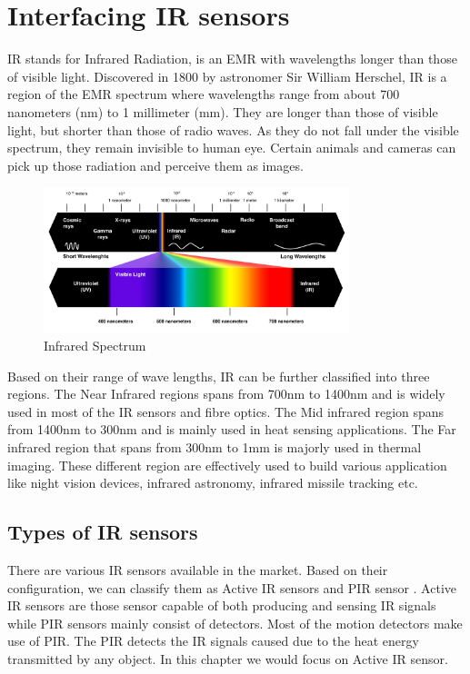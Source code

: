 \chapter{Interfacing IR sensors}
\label{ch:ir-sensors}

\ac{IR} stands for Infrared Radiation, is an \ac{EMR} with wavelengths longer than those of visible light. Discovered in 1800 by astronomer Sir William Herschel, \ac{IR} is a region of the \ac{EMR} spectrum where wavelengths range from about 700 nanometers (nm) to 1 millimeter (mm). They are longer than those of visible light, but shorter than those of radio waves. As they do not fall under the visible spectrum, they remain invisible to human eye. Certain animals and cameras can pick up those radiation and perceive them as images.

\begin{figure}
    \centering
	\includegraphics[width=3.5in]{Images/IR Sensor/IR_spectrum.jpg}
	\caption{Infrared Spectrum}
\end{figure}

Based on their range of wave lengths, \ac{IR} can be further classified into three regions. The Near Infrared regions spans from 700nm to 1400nm and is widely used in most of the \ac{IR} sensors and fibre optics. The Mid infrared region spans from 1400nm to 300nm and is mainly used in heat sensing applications. The Far infrared region that spans from 300nm to 1mm is majorly used in thermal imaging. These different region are effectively used to build various application like night vision devices, infrared astronomy, infrared missile tracking etc.


\section{Types of \ac{IR} sensors}
There are various \ac{IR} sensors available in the market. Based on their configuration, we can classify them as Active \ac{IR} sensors and \ac{PIR} sensor . Active \ac{IR} sensors are those sensor capable of both producing and sensing \ac{IR} signals while \ac{PIR} sensors mainly consist of detectors. Most of the motion detectors make use of \ac{PIR}. The \ac{PIR} detects the \ac{IR} signals caused due to the heat energy transmitted by any object. In this chapter we would focus on Active \ac{IR} sensor.

